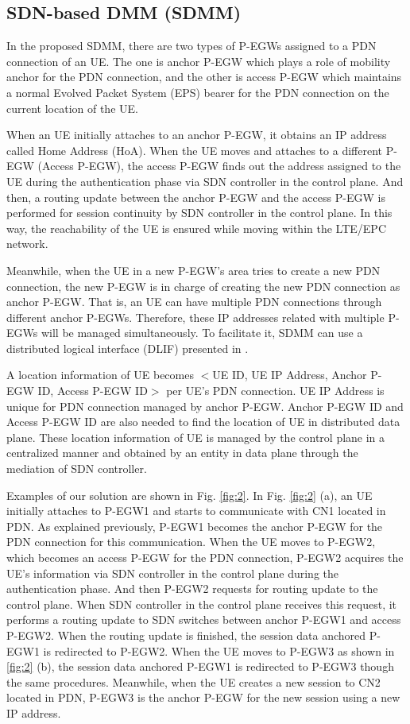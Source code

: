 \documentclass[runningheads,a4paper]{llncs}
\begin{document}
\subsection{SDN-based DMM (SDMM)}

In the proposed SDMM, there are two types of P-EGWs assigned to a PDN connection of an UE. The one is anchor P-EGW which plays a role of mobility anchor for the PDN connection, and the other is access P-EGW which maintains a normal Evolved Packet System (EPS) bearer for the PDN connection on the current location of the UE. 

When an UE initially attaches to an anchor P-EGW, it obtains an IP address called Home Address (HoA). When the UE moves and attaches to a different P-EGW (Access P-EGW), the access P-EGW finds out the address assigned to the UE during the authentication phase via SDN controller in the control plane. And then, a routing update between the anchor P-EGW and the access P-EGW is performed for session continuity by SDN controller in the control plane. In this way, the reachability of the UE is ensured while moving within the LTE/EPC network.

Meanwhile, when the UE in a new P-EGW's area tries to create a new PDN connection, the new P-EGW is in charge of creating the new PDN connection as anchor P-EGW. That is, an UE can have multiple PDN connections through different anchor P-EGWs. Therefore, these IP addresses related with multiple P-EGWs will be managed simultaneously. To facilitate it, SDMM can use a distributed logical interface (DLIF) presented in \cite{ref10}.

A location information of UE becomes $<$UE ID, UE IP Address, Anchor P-EGW ID, Access P-EGW ID$>$ per UE's PDN connection. UE IP Address is unique for PDN connection managed by anchor P-EGW. Anchor P-EGW ID and Access P-EGW ID are also needed to find the location of UE in distributed data plane. These location information of UE is managed by the control plane in a centralized manner and obtained by an entity in data plane through the mediation of SDN controller.

Examples of our solution are shown in Fig. \ref{fig:2}. In Fig. \ref{fig:2} (a), an UE initially attaches to P-EGW1 and starts to communicate with CN1 located in PDN. As explained previously, P-EGW1 becomes the anchor P-EGW for the PDN connection for this communication. When the UE moves to P-EGW2, which becomes an access P-EGW for the PDN connection, P-EGW2 acquires the UE's information via SDN controller in the control plane during the authentication phase. And then P-EGW2 requests for routing update to the control plane. When SDN controller in the control plane receives this request, it performs a routing update to SDN switches between anchor P-EGW1 and access P-EGW2. When the routing update is finished, the session data anchored P-EGW1 is redirected to P-EGW2. When the UE moves to P-EGW3 as shown in \ref{fig:2} (b), the session data anchored P-EGW1 is redirected to P-EGW3 though the same procedures. Meanwhile, when the UE creates a new session to CN2 located in PDN, P-EGW3 is the anchor P-EGW for the new session using a new IP address.
\end{document}
